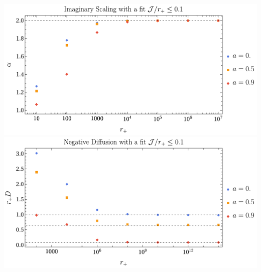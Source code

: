 \documentclass[xcolor=dvipsnames]{beamer}
\begin{document}
\begin{frame}
  \begin{columns}[c]
    \begin{column}{0.5\textwidth}
      \includegraphics[width=1.05\textwidth]{figs/vector_dispersive_mode_rp_vs_im_scaling_over_a_scaled_Jleq0_1.pdf}\\
      \includegraphics[width=1.05\textwidth]{figs/vector_dispersive_mode_rp_vs_diffusion_over_a_scaled_Jleq0_1.pdf}
    \end{column}


\end{columns}
\end{frame}
\end{document}
